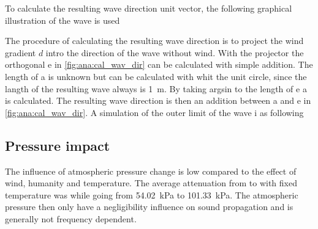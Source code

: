 To calculate the resulting wave direction unit vector, the following graphical illustration of the wave is used


\startexplain
{}
\stopexplain


The procedure of calculating the resulting wave direction is to project the wind gradient $d$ intro the direction of the wave without wind. With the projector the orthogonal e in \autoref{fig:ana:cal_wav_dir} can be calculated with simple addition. The length of a is unknown but can be calculated with whit the unit circle, since the langth of the resulting wave always is \SI{1}{\meter}. By taking argsin to the length of e a is calculated. The resulting wave direction is then an addition between a and e in \autoref{fig:ana:cal_wav_dir}. A simulation of the outer limit of the wave i as following





\subsection{Pressure impact}
The influence of atmospheric pressure change is low compared to the effect of wind, humanity and temperature. The average attenuation from  to  with fixed temperature was  while going from \SI{54.02}{\kilo\pascal} to \SI{101.33}{\kilo\pascal}. The atmospheric pressure then only have a negligibility influence on sound propagation and is generally not frequency dependent. 
 
 
